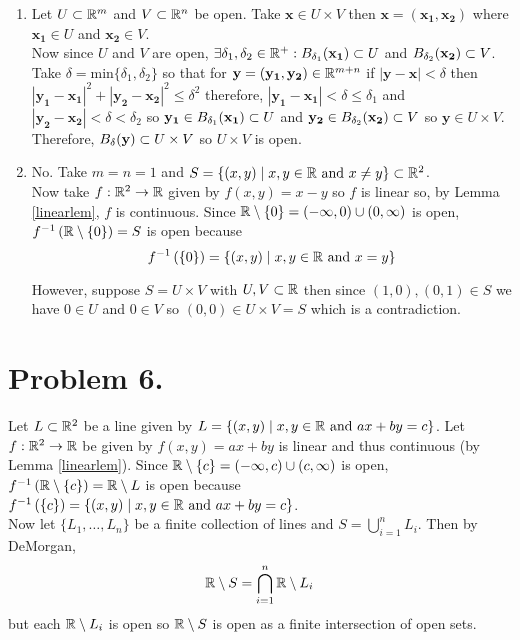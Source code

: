 \documentclass[12pt]{extarticle}
\begin{document}
\begin{enumerate}
\item Let $U \subset \mathbb{R}^m$ and $V \subset \mathbb{R}^n$ be open. Take $\mathbf{x} \in U \times V$ then $\mathbf{x} = (\mathbf{x_1}, \mathbf{x_2})$ where $\mathbf{x_1} \in U$ and $\mathbf{x_2} \in V$.\\

Now since $U$ and $V$ are open, $\exists \delta_1,\delta_2 \in \mathbb{R}^+ : B_{\delta_1} \! \left(\mathbf{x_1} \right) \subset U$ and $B_{\delta_2} \! \left(\mathbf{x_2} \right) \subset V$. \\

Take $\delta = \text{min} \{ \delta_1, \delta_2 \}$ so that for $\mathbf{y} = (\mathbf{y_1}, \mathbf{y_2}) \in \mathbb{R}^{m+n}$ if $| \mathbf{y} - \mathbf{x} | < \delta$ then $|\mathbf{y_1} - \mathbf{x_1}|^2 + |\mathbf{y_2} - \mathbf{x_2}|^2 \le \delta^2$ therefore, $|\mathbf{y_1} - \mathbf{x_1}| < \delta \le \delta_1$ and $|\mathbf{y_2} - \mathbf{x_2}| < \delta < \delta_2$ so $\mathbf{y_1} \in B_{\delta_1} \! \left(\mathbf{x_1} \right) \subset U$ and $\mathbf{y_2} \in B_{\delta_2} \! \left(\mathbf{x_2} \right) \subset V$ so $\mathbf{y} \in U \times V$. \\
Therefore, $B_{\delta} \! \left(\mathbf{y} \right) \subset U \times V$ so $U \times V$ is open.

\item No. Take $m = n = 1$ and $S  = \{ (x, y) \mid x,y \in \mathbb{R} \text{ and } x \neq y \} \subset \mathbb{R}^2$. \\ 

Now take $f : \mathbb{R}^2 \rightarrow \mathbb{R}$ given by $f(x,y) = x-y$ so $f$ is linear so, by Lemma \ref{linearlem}, $f$ is continuous. Since $\mathbb{R} \setminus \{ 0 \} = (-\infty, 0) \cup (0, \infty)$ is open, $f^{-1} \left( \mathbb{R} \setminus \{ 0 \} \right) = S$ is open because \[f^{-1} \left( \{ 0 \} \right) = \{ (x,y) \mid x,y \in \mathbb{R} \text{ and } x = y \}\]

However, suppose $S = U \times V$ with $U, V \subset \mathbb{R}$ then since $(1, 0), (0, 1) \in S$ we have $0 \in U$ and $0 \in V$ so $(0, 0) \in U \times V = S$ which is a contradiction.
\end{enumerate}

\section*{Problem 6.} Let $L \subset \mathbb{R}^2$ be a line given by $L = \{(x, y) \mid x,y \in \mathbb{R} \text{ and } ax + by = c \}$. Let $f : \mathbb{R}^2 \rightarrow \mathbb{R}$ be given by $f(x,y) = ax + by$ is linear and thus continuous (by Lemma \ref{linearlem}). Since $\mathbb{R} \setminus \{ c \} = (-\infty, c) \cup (c, \infty)$ is open, $f^{-1} \left( \mathbb{R} \setminus \{ c \} \right) = \mathbb{R} \setminus L$ is open because $f^{-1} \left( \{ c \} \right) = \{ (x,y) \mid x,y \in \mathbb{R} \text{ and } ax + by = c \}$.  \\  
Now let $\{L_1, \dots , L_n \}$ be a finite collection of lines and $S = \bigcup\limits_{i = 1}^{n} L_i$. Then by DeMorgan, \[\mathbb{R} \setminus S = \bigcap\limits_{i = 1}^{n} \mathbb{R} \setminus L_i\] but each $\mathbb{R} \setminus L_i$ is open so $\mathbb{R} \setminus S$ is open as a finite intersection of open sets. 
\end{document}
